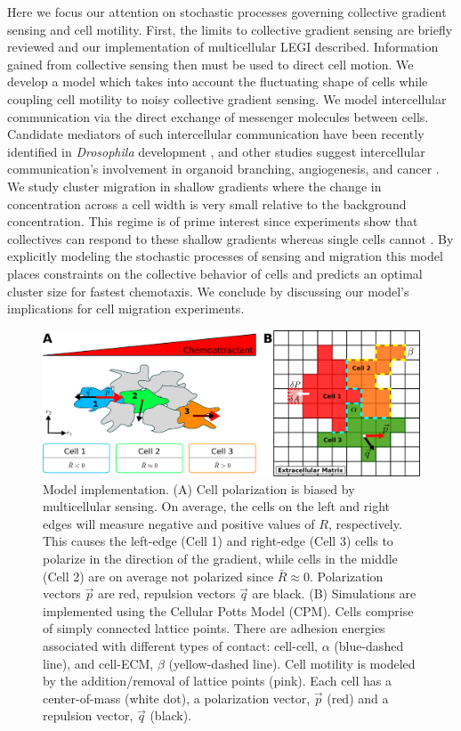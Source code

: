 Here we focus our attention on stochastic processes governing collective gradient sensing and cell motility. First, the limits to collective gradient sensing are briefly reviewed and our implementation of multicellular LEGI described. Information gained from collective sensing then must be used to direct cell motion. We develop a model which takes into account the fluctuating shape of cells while coupling cell motility to noisy collective gradient sensing. We model intercellular communication via the direct exchange of messenger molecules between cells. Candidate mediators of such intercellular communication have been recently identified in \textit{Drosophila} development \cite{ramel2013rab11}, and other studies suggest intercellular communication's involvement in organoid branching, angiogenesis, and cancer \cite{ellison2016cell,gerhardt2003vegf,hsu2000cadherin,friedl2009collective}. We study cluster migration in shallow gradients where the change in concentration across a cell width is very small relative to the background concentration. This regime is of prime interest since experiments show that collectives can respond to these shallow gradients whereas single cells cannot \cite{ellison2016cell,malet2015collective,rosoff2004new}. By explicitly modeling the stochastic processes of sensing and migration this model places constraints on the collective behavior of cells and predicts an optimal cluster size for fastest chemotaxis. We conclude by discussing our model's implications for cell migration experiments.


\begin{figure}
    \centering
        \includegraphics[width=.75\textwidth]{../fig/ch2_fig1.png}
    \caption{Model implementation. (A) Cell polarization is biased by multicellular sensing. On average, the cells on the left and right edges will measure negative and positive values of $R$, respectively. This causes the left-edge (Cell 1) and right-edge (Cell 3) cells to polarize in the direction of the gradient, while cells in the middle (Cell 2) are on average not polarized since $\bar{R} \approx 0$. Polarization vectors $\vec{p}$ are red, repulsion vectors $\vec{q}$ are black. (B) Simulations are implemented using the Cellular Potts Model (CPM). Cells comprise of simply connected lattice points. There are adhesion energies associated with different types of contact: cell-cell, $\alpha$ (blue-dashed line), and cell-ECM, $\beta$ (yellow-dashed line). Cell motility is modeled by the addition/removal of lattice points (pink). Each cell has a center-of-mass (white dot), a polarization vector, $\vec{p}$ (red) and a repulsion vector, $\vec{q}$ (black).} \label{fig:model}
\end{figure}



